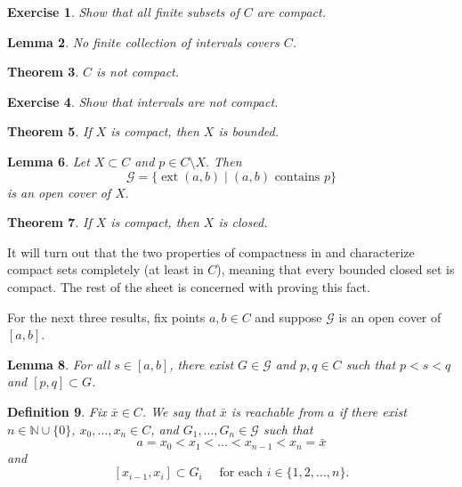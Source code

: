 \documentclass{amsart}
\newtheorem{theorem}{Theorem}
\newtheorem{lemma}[theorem]{Lemma}
\newtheorem{definition}[theorem]{Definition}
\newtheorem{exercise}[theorem]{Exercise}
\newcommand{\N}{\mathbb N}
\newcommand{\1}{\mathds{1}}
\DeclareMathOperator{\ext}{ext}
\def \N {{\mathbb {N}}}
\numberwithin{equation}{section}
\numberwithin{theorem}{section}
\begin{document}
\begin{exercise}
Show that all finite subsets of $C$ are compact.
\end{exercise} 

\begin{lemma}
No finite collection of intervals covers $C$.
\end{lemma}

\begin{theorem}  
$C$ is not compact.

\end{theorem}


\begin{exercise}
Show that intervals are not compact.
\end{exercise} 

\begin{theorem}  \label{compactimpliesbounded} If $X$ is compact, then $X$ is bounded.
\end{theorem}


\begin{lemma}   Let $X\subset C$ and $p\in C\setminus X.$ Then
\[
\mathcal{G} = \{ \ext(a,b) \mid (a,b) \text{ contains } p  \}
\]
is an open cover of $X.$ 
\end{lemma}



\begin{theorem} \label{compactimpliesclosed} If $X$ is compact, then $X$ is closed.
\end{theorem}

It will turn out that the two properties of compactness in  and  characterize compact sets completely (at least in $C$), meaning that every bounded closed set is compact.  The rest of the sheet is concerned with proving this fact.


\newcommand\cG{\mathcal G}

For the next three results, fix points $a,b\in C$ and suppose $\cG$ is an open cover of $[a,b]$.

\begin{lemma}
\label{lem2}
For all $s\in[a,b]$, there exist $G\in\cG$ and $p,q\in C$ such that $p<s<q$ and $[p,q]\subset G$.
\end{lemma}



\begin{definition}
	Fix $\bar x \in C$.  We say that $\bar x$ is \emph{reachable from $a$} if there exist $n\in\N\cup\{0\}$, $x_0,\ldots,x_n\in C$, and $G_1,\ldots,G_n\in\cG$ such that 
	\[
		a=x_0<x_1<\ldots<x_{n-1}<x_n=\bar x
	\]
	and
	\[
		[x_{i-1},x_i]\subset G_i
			\quad\text{ for each } i \in \{1,2,\dots, n\}.
	\]
\end{definition}
\end{document}
